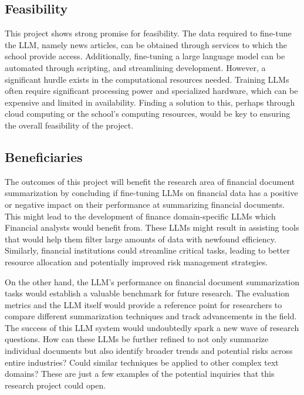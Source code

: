 \subsection{Feasibility}\label{subsec:feasibility}

This project shows strong promise for feasibility.
The data required to fine-tune the LLM, namely news articles, can be obtained through services to which the school
provide access.
Additionally, fine-tuning a large language model can be automated through scripting, and streamlining development.
However, a significant hurdle exists in the computational resources needed.
Training LLMs often require significant processing power and specialized hardware, which can be expensive and limited in
availability.
Finding a solution to this, perhaps through cloud computing or the school’s computing resources, would be key to
ensuring the overall feasibility of the project.

\subsection{Beneficiaries}\label{subsec:beneficiaries}

The outcomes of this project will benefit the research area of financial document summarization by concluding if
fine-tuning LLMs on financial data has a positive or negative impact on their performance at summarizing financial
documents.
This might lead to the development of finance domain-specific LLMs which Financial analysts would benefit from.
These LLMs might result in assisting tools that would help them filter large amounts of data with newfound efficiency.
Similarly, financial institutions could streamline critical tasks, leading to better resource allocation and potentially
improved risk management strategies.

On the other hand, the LLM's performance on financial document summarization tasks would establish a valuable benchmark
for future research.
The evaluation metrics and the LLM itself would provide a reference point for researchers to compare different
summarization techniques and track advancements in the field.
The success of this LLM system would undoubtedly spark a new wave of research questions.
How can these LLMs be further refined to not only summarize individual documents but also identify broader trends and
potential risks across entire industries?
Could similar techniques be applied to other complex text domains?
These are just a few examples of the potential inquiries that this research project could open.
